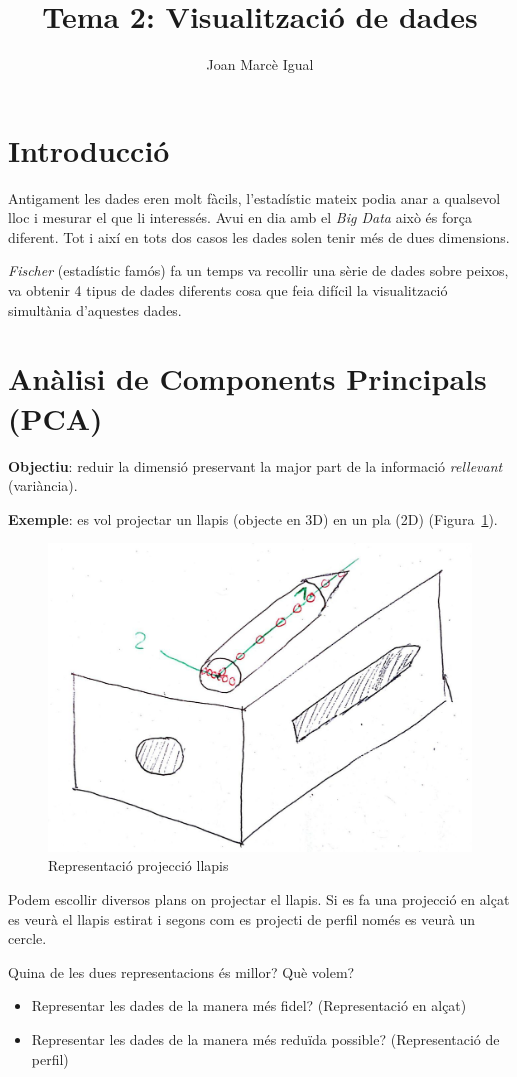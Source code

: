 \documentclass[a4paper]{article}
\title{Tema 2: Visualització de dades}
\author{Joan Marcè Igual}
\begin{document}
\maketitle

\section{Introducció}

Antigament les dades eren molt fàcils, l'estadístic mateix podia anar a qualsevol lloc i mesurar el que li interessés. Avui en dia amb el \emph{Big Data} això és força diferent. Tot i així en tots dos casos les dades solen tenir més de dues dimensions. 

\emph{Fischer} (estadístic famós) fa un temps va recollir una sèrie de dades sobre peixos, va obtenir 4 tipus de dades diferents cosa que feia difícil la visualització simultània d'aquestes dades.

\section{Anàlisi de Components Principals (PCA)}

\textbf{Objectiu}: reduir la dimensió preservant la major part de la informació \emph{rellevant} (variància). 

\textbf{Exemple}: es vol projectar un llapis (objecte en 3D) en un pla (2D) (Figura~\ref{fig:llapis}).

\begin{figure}[h!]
	\centering
	\includegraphics[width=0.5\linewidth]{llapis.jpg}
	\caption{Representació projecció llapis}
	\label{fig:llapis}
\end{figure}

Podem escollir diversos plans on projectar el llapis. Si es fa una projecció en alçat es veurà el llapis estirat i segons com es projecti de perfil només es veurà un cercle.

Quina de les dues representacions és millor? Què volem? 
\begin{itemize}
	\item Representar les dades de la manera més fidel? (Representació en alçat)
	\item Representar les dades de la manera més reduïda possible? (Representació de perfil)
\end{itemize}
\end{document}
